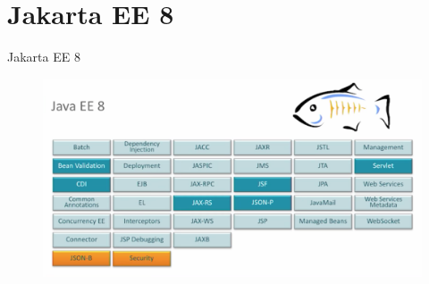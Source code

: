 \documentclass{beamer}
\begin{document}
\section{Jakarta EE 8}
\begin{frame}{Jakarta EE 8}
\begin{figure}
	\centering
	\includegraphics[width=\linewidth]{Images/javaee8}
\end{figure}
\end{frame}
\end{document}

